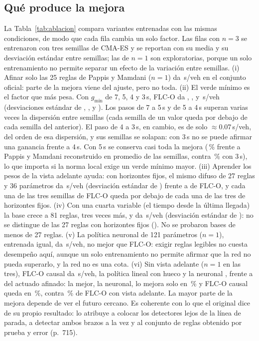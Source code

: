\documentclass[journal]{IEEEtran}
\newcommand{\FLC}{FLC-O}
\newcommand{\PMR}{Pappis y Mamdani reconstruido}
\begin{document}
\subsection{Qué produce la mejora}
\label{sec:res-abl}
La Tabla~\ref{tab:ablacion} compara variantes entrenadas con las mismas condiciones, de modo que cada fila cambia un solo factor. Las filas con $n=3$ se entrenaron con tres semillas de CMA-ES y se reportan con su media y su desviación estándar entre semillas; las de $n=1$ son exploratorias, porque un solo entrenamiento no permite separar un efecto de la variación entre semillas.
(i) Afinar solo las 25 reglas de Pappis y Mamdani ($n=1$) da \DelayOfPapAf{}\,s/veh en el conjunto oficial: parte de la mejora viene del ajuste, pero no toda.
(ii) El verde mínimo es el factor que más pesa. Con $g_{\min}$ de 7, 5, 4 y 3\,s, \FLC{} da \MedOfGSiete{}, \MedOfGCinco{}, \MedOfGCuatro{} y \MedOfGTres{}\,s/veh (desviaciones estándar de \SdOfGSiete{}, \SdOfGCinco{}, \SdOfGCuatro{} y \SdOfGTres{}). Los pasos de 7 a 5\,s y de 5 a 4\,s superan varias veces la dispersión entre semillas (cada semilla de un valor queda por debajo de cada semilla del anterior). El paso de 4 a 3\,s, en cambio, es de solo $\approx$0.07\,s/veh, del orden de esa dispersión, y sus semillas se solapan: con 3\,s no se puede afirmar una ganancia frente a 4\,s. Con 5\,s se conserva casi toda la mejora (\RedPapMedGCinco\,\% frente a \PMR{} en promedio de las semillas, contra \RedPapMedGTres\,\% con 3\,s), lo que importa si la norma local exige un verde mínimo mayor.
(iii) Aprender los pesos de la vista adelante ayuda: con horizontes fijos, el mismo difuso de 27 reglas y 36 parámetros da \MedOfFijos{}\,s/veh (desviación estándar de \SdOfFijos{}) frente a \MedOfGTres{} de \FLC{}, y cada una de las tres semillas de \FLC{} queda por debajo de cada una de las tres de horizontes fijos.
(iv) Con una cuarta variable (el tiempo desde la última llegada) la base crece a 81 reglas, tres veces más, y da \MedOfReglas{}\,s/veh (desviación estándar de \SdOfReglas{}): no se distingue de las 27 reglas con horizontes fijos (\MedOfFijos{}). No se probaron bases de menos de 27 reglas.
(v) La política neuronal de 121 parámetros ($n=1$), entrenada igual, da \DelayOfMlp{}\,s/veh, no mejor que \FLC{}: exigir reglas legibles no cuesta desempeño aquí, aunque un solo entrenamiento no permite afirmar que la red no pueda superarlo, y la red no es una cota.
(vi) Sin vista adelante ($n=1$ en las tres), \FLC{} causal da \DelayOfFlcC{}\,s/veh, la política lineal con hueco \DelayOfLinC{} y la neuronal \DelayOfMlpC{}, frente a \DelayOfActAf{} del actuado afinado: la mejor, la neuronal, lo mejora solo en \RedActMlpC\,\% y \FLC{} causal queda en \RedActFlcC\,\%, contra \RedActAfOf\,\% de \FLC{} con vista adelante. La mayor parte de la mejora depende de ver el futuro cercano. Es coherente con lo que el original dice de su propio resultado: lo atribuye a colocar los detectores lejos de la línea de parada, a detectar ambos brazos a la vez y al conjunto de reglas obtenido por prueba y error (p.~715).
\end{document}
